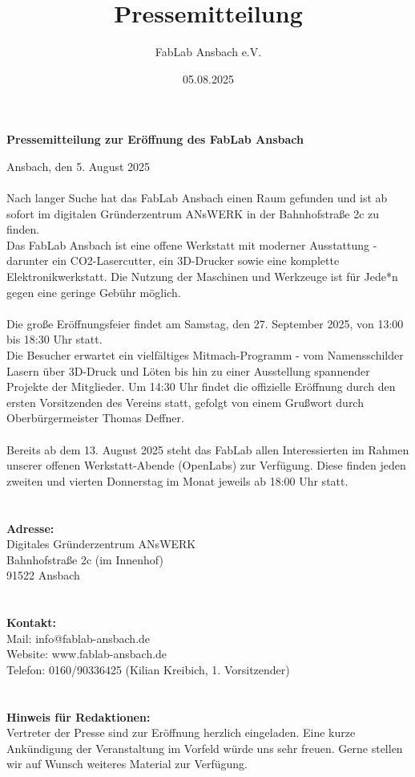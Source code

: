 \title{Pressemitteilung}
\author{FabLab Ansbach e.V.}
\date{05.08.2025}





\begin{center}
    \LARGE\textbf{Pressemitteilung zur Eröffnung des FabLab Ansbach}
\end{center}
Ansbach, den 5. August 2025 \\
\\
Nach langer Suche hat das FabLab Ansbach einen Raum gefunden und ist ab sofort im digitalen Gründerzentrum ANsWERK in der Bahnhofstraße 2c zu finden. \\
Das FabLab Ansbach ist eine offene Werkstatt mit moderner Ausstattung - darunter ein CO2-Lasercutter, ein 3D-Drucker sowie eine komplette Elektronikwerkstatt. Die Nutzung der Maschinen und Werkzeuge ist für Jede*n gegen eine geringe Gebühr möglich. \\
\\
Die große Eröffnungsfeier findet am Samstag, den 27. September 2025, von 13:00 bis 18:30 Uhr statt. \\
Die Besucher erwartet ein vielfältiges Mitmach-Programm - vom Namensschilder Lasern über 3D-Druck und Löten bis hin zu einer Ausstellung spannender Projekte der Mitglieder. Um 14:30 Uhr findet die offizielle Eröffnung durch den ersten Vorsitzenden des Vereins statt, gefolgt von einem Grußwort durch Oberbürgermeister Thomas Deffner. \\
\\
Bereits ab dem 13. August 2025 steht das FabLab allen Interessierten im Rahmen unserer offenen Werkstatt-Abende (OpenLabs) zur Verfügung. Diese finden jeden zweiten und vierten Donnerstag im Monat jeweils ab 18:00 Uhr statt. \\
\\
\\
\textbf{Adresse:} \\
Digitales Gründerzentrum ANsWERK \\
Bahnhofstraße 2c (im Innenhof) \\
91522 Ansbach \\
\\
\\
\textbf{Kontakt:} \\
Mail: info@fablab-ansbach.de \\
Website: www.fablab-ansbach.de \\
Telefon: 0160/90336425 (Kilian Kreibich, 1. Vorsitzender)\\
\\
\\
\textbf{Hinweis für Redaktionen:} \\
Vertreter der Presse sind zur Eröffnung herzlich eingeladen. Eine kurze Ankündigung der Veranstaltung im Vorfeld würde uns sehr freuen. Gerne stellen wir auf Wunsch weiteres Material zur Verfügung.

